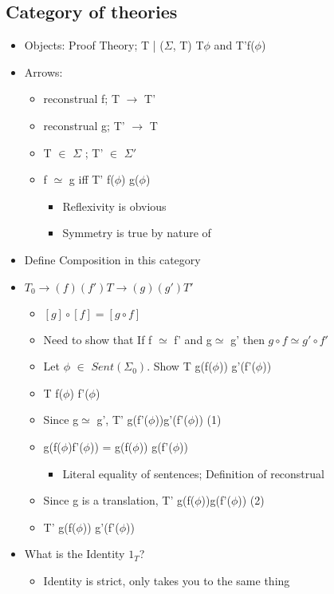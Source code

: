 \documentclass[11pt]{article}
\begin{document}
\subsection{Category of theories}
\label{sec:org26d6833}
\begin{itemize}
\item Objects: Proof Theory; T | (\(\Sigma\), T) \implies T\vdash \(\phi\) and T'\vdash f(\(\phi\))
\item Arrows:
\begin{itemize}
\item reconstrual f; T \(\rightarrow\) T'
\item reconstrual g; T' \(\rightarrow\) T
\item T \(\in\) \(\Sigma\) ; T' \(\in\) \(\Sigma \prime\)
\item f \(\simeq\) g iff T' \vdash f(\(\phi\)) \iff g(\(\phi\))
\begin{itemize}
\item Reflexivity is obvious
\item Symmetry is true by nature of \iff
\end{itemize}
\end{itemize}
\item Define Composition in this category
\item \(T_0 \rightarrow (f)(f') T \rightarrow (g)(g') T'\)
\begin{itemize}
\item \([g]\circ [f] = [g \circ f]\)
\item Need to show that If f \(\simeq\) f' and g\(\simeq\) g' then \(g\circ f \simeq g'\circ f'\)
\item Let \(\phi\) \(\in\) \(Sent(\Sigma_0)\). Show T \vdash g(f(\(\phi\))) \iff g'(f'(\(\phi\)))
\item T \vdash f(\(\phi\)) \iff f'(\(\phi\))
\item Since g\(\simeq\) g', T' \vdash g(f'(\(\phi\)))\iff g'(f'(\(\phi\))) (1)
\item g(f(\(\phi\))\iff f'(\(\phi\))) = g(f(\(\phi\))) \iff g(f'(\(\phi\)))
\begin{itemize}
\item Literal equality of sentences; Definition of reconstrual
\end{itemize}
\item Since g is a translation, T' \vdash g(f(\(\phi\)))\iff g(f'(\(\phi\))) (2)
\item T' \vdash g(f(\(\phi\))) \iff g'(f'(\(\phi\)))
\end{itemize}
\item What is the Identity \(1_T\)?
\begin{itemize}
\item Identity is strict, only takes you to the same thing
\end{itemize}
\end{itemize}
\end{document}
